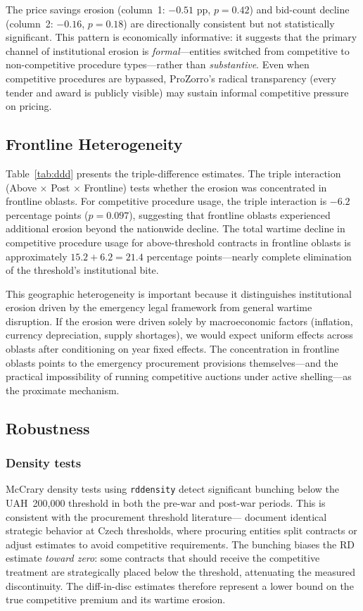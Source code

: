 \documentclass[12pt]{article}
\begin{document}
The price savings erosion (column~1: $-0.51$ pp, $p = 0.42$) and bid-count decline (column~2: $-0.16$, $p = 0.18$) are directionally consistent but not statistically significant. This pattern is economically informative: it suggests that the primary channel of institutional erosion is \textit{formal}---entities switched from competitive to non-competitive procedure types---rather than \textit{substantive}. Even when competitive procedures are bypassed, ProZorro's radical transparency (every tender and award is publicly visible) may sustain informal competitive pressure on pricing.

\subsection{Frontline Heterogeneity}



Table~\ref{tab:ddd} presents the triple-difference estimates. The triple interaction (Above $\times$ Post $\times$ Frontline) tests whether the erosion was concentrated in frontline oblasts. For competitive procedure usage, the triple interaction is $-6.2$ percentage points ($p = 0.097$), suggesting that frontline oblasts experienced additional erosion beyond the nationwide decline. The total wartime decline in competitive procedure usage for above-threshold contracts in frontline oblasts is approximately $15.2 + 6.2 = 21.4$ percentage points---nearly complete elimination of the threshold's institutional bite.

This geographic heterogeneity is important because it distinguishes institutional erosion driven by the emergency legal framework from general wartime disruption. If the erosion were driven solely by macroeconomic factors (inflation, currency depreciation, supply shortages), we would expect uniform effects across oblasts after conditioning on year fixed effects. The concentration in frontline oblasts points to the emergency procurement provisions themselves---and the practical impossibility of running competitive auctions under active shelling---as the proximate mechanism.

\subsection{Robustness}

\subsubsection*{Density tests} McCrary density tests using \texttt{rddensity} detect significant bunching below the UAH~200,000 threshold in both the pre-war and post-war periods. This is consistent with the procurement threshold literature---\citet{Palguta2017} document identical strategic behavior at Czech thresholds, where procuring entities split contracts or adjust estimates to avoid competitive requirements. The bunching biases the RD estimate \textit{toward zero}: some contracts that should receive the competitive treatment are strategically placed below the threshold, attenuating the measured discontinuity. The diff-in-disc estimates therefore represent a lower bound on the true competitive premium and its wartime erosion.
\end{document}
